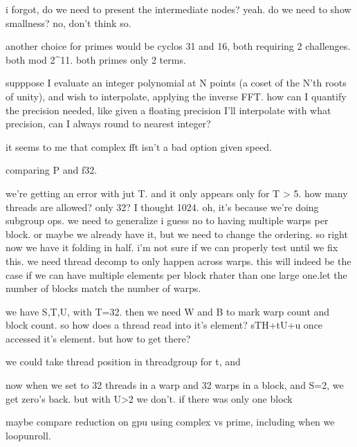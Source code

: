 i forgot, do we need to present the intermediate nodes? yeah. do we need to show smallness? no, don't think so. 



another choice for primes would be cyclos 31 and 16, both requiring 2 challenges. both mod 2^11. both primes only 2 terms. 

supppose I evaluate an integer polynomial at N points (a coset of the N'th roots of unity), and wish to interpolate, applying the inverse FFT. how can I quantify the precision needed, like given a floating precision I'll interpolate with what precision, can I always round to nearest integer? 

it seems to me that complex fft isn't a bad option given speed. 


comparing P and f32.

we're getting an error with jut T. and it only appears only for T > 5.
how many threads are allowed? only 32? I thought 1024. 
oh, it's because we're doing subgroup ops. we need to generalize i guess no to having multiple warps per block. or maybe we already have it, but we need to change the ordering.
so right now we have it folding in half. 
i'm not sure if we can properly test until we fix this. we need thread decomp to only happen across warps. this will indeed be the case if we can have multiple elements per block rhater than one large one.let the number of blocks match the number of warps. 

we have S,T,U, with T=32.
then we need W and B to mark warp count and block count.
so how does a thread read into it's element?
sTH+tU+u once accessed it's element.
but how to get there?

we could take thread position in threadgroup for t, and 

now when we set to 32 threads in a warp and 32 warps in a block, and S=2, we get zero's back. but with U>2 we don't. 
if there was only one block

maybe compare reduction on gpu using complex vs prime, including when we loopunroll. 




